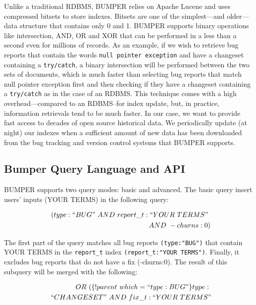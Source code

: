 \documentclass[12pt]{report}
\begin{document}
Unlike a traditional RDBMS, BUMPER relies on Apache Lucene and uses
compressed bitsets to store indexes. Bitsets are one of the
simplest---and older---data structure that contains only 0 and 1. BUMPER
supports binary operations like intersection, AND, OR and XOR that can
be performed in a less than a second even for millions of records. As an
example, if we wish to retrieve bug reports that contain the words
\lstinline!null pointer exception! and have a changeset containing a
\lstinline!try/catch!, a binary intersection will be performed between
the two sets of documents, which is much faster than selecting bug
reports that match null pointer exception first and then checking if
they have a changeset containing a \lstinline!try/catch! as in the case
of an RDBMS. This technique comes with a high overhead---compared to an
RDBMS--for index update, but, in practice, information retrievals tend
to be much faster. In our case, we want to provide fast access to
decades of open source historical data. We periodically update (at
night) our indexes when a sufficient amount of new data has been
downloaded from the bug tracking and version control systems that BUMPER
supports.

\subsection{\texorpdfstring{Bumper Query Language and API
\label{sub:Bumper Query Language and API}}{Bumper Query Language and API }}\label{bumper-query-language-and-api}

BUMPER supports two query modes: basic and advanced. The basic query
insert users' inputs (YOUR TERMS) in the following query:

\begin{equation}
\begin{split}
~~(type:``BUG"~AND~report\_t:``YOUR~TERMS"~\\
~~AND~-churns:0)
\end{split}
\end{equation}

The first part of the query matches all bug reports
\lstinline!(type:"BUG")! that contain YOUR TERMS in the
\lstinline!report_t! index \lstinline!(report_t:"YOUR TERMS")!. Finally,
it excludes bug reports that do not have a fix (-churns:0). The result
of this subquery will be merged with the following:

\begin{equation}
\begin{split}
~~OR~(\{!parent~which=``type:BUG"\}type:~\\
~~``CHANGESET"~AND~fix\_t:``YOUR~TERMS"
\end{split}
\end{equation}
\end{document}
